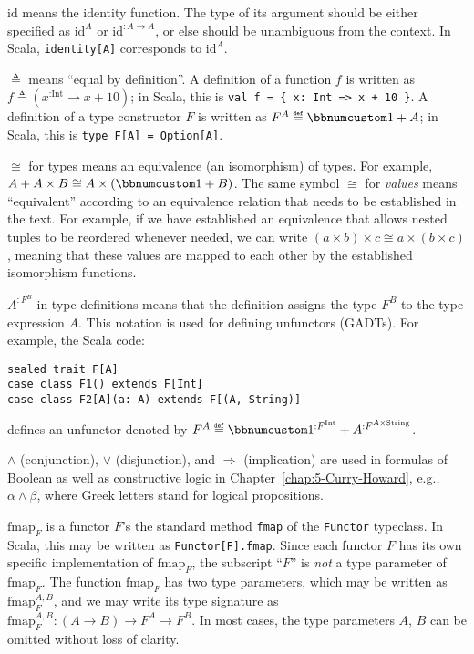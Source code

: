 $\text{id}$ means the identity function. The type of its argument
should be either specified as $\text{id}^{A}$ or $\text{id}^{:A\rightarrow A}$,
or else should be unambiguous from the context. In Scala,  \lstinline!identity[A]!
corresponds to $\text{id}^{A}$.

$\triangleq$ means \textsf{``}equal by definition\textsf{''}. A definition of a function
$f$ is written as $f\triangleq(x^{:\text{Int}}\rightarrow x+10)$;
in Scala, this is \lstinline!val f = { x: Int => x + 10 }!. A definition
of a type constructor $F$ is written as $F^{A}\triangleq\bbnum 1+A$;
in Scala, this is \lstinline!type F[A] = Option[A]!.

$\cong$ for types means an equivalence (an isomorphism) of types.
For example, $A+A\times B\cong A\times\left(\bbnum 1+B\right)$. The
same symbol $\cong$ for \emph{values} means \textsf{``}equivalent\textsf{''} according
to an equivalence relation that needs to be established in the text.
For example, if we have established an equivalence that allows nested
tuples to be reordered whenever needed, we can write $\left(a\times b\right)\times c\cong a\times\left(b\times c\right)$,
meaning that these values are mapped to each other by the established
isomorphism functions. 

$A^{:F^{B}}$ in type definitions means that the definition assigns
the type $F^{B}$ to the type expression $A$. This notation is used
for defining unfunctors (GADTs). For example, the Scala code:

\begin{lstlisting}
sealed trait F[A]
case class F1() extends F[Int]
case class F2[A](a: A) extends F[(A, String)]
\end{lstlisting}
defines an unfunctor denoted by $F^{A}\triangleq\bbnum 1^{:F^{\text{Int}}}+A^{:F^{A\times\text{String}}}$.

$\wedge$ (conjunction), $\vee$ (disjunction), and $\Rightarrow$
(implication) are used in formulas of Boolean as well as constructive
logic in Chapter~\ref{chap:5-Curry-Howard}, e.g., $\alpha\wedge\beta$,
where Greek letters stand for logical propositions.

$\text{fmap}_{F}$ is a functor $F$\textsf{'}s the standard method \lstinline!fmap!
of the \lstinline!Functor! typeclass. In Scala, this may be written
as \texttt{}\lstinline!Functor[F].fmap!. Since each functor $F$
has its own specific implementation of $\text{fmap}_{F}$, the subscript
\textsf{``}$F$\textsf{''} is \emph{not} a type parameter of $\text{fmap}_{F}$. The
function $\text{fmap}_{F}$ has two type parameters, which may be
written as $\text{fmap}_{F}^{A,B}$, and we may write its type signature
as $\text{fmap}_{F}^{A,B}:\left(A\rightarrow B\right)\rightarrow F^{A}\rightarrow F^{B}$.
In most cases, the type parameters $A$, $B$ can be omitted without
loss of clarity.

